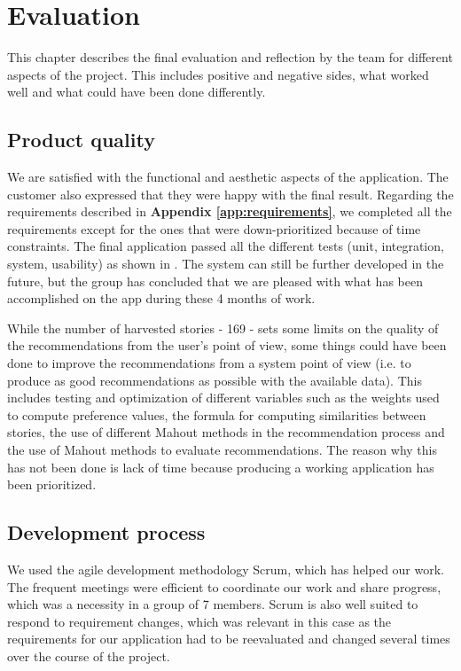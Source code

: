 
\chapter{Evaluation}

This chapter describes the final evaluation and reflection by the team for different aspects of the project. This includes positive and negative sides, what worked well and what could have been done differently.

\section{Product quality}

We are satisfied with the functional and aesthetic aspects of the application. The customer also expressed that they were happy with the final result. Regarding the requirements described in \textbf{Appendix \ref{app:requirements}}, we completed all the requirements except for the ones that were down-prioritized because of time constraints.
The final application passed all the different tests (unit, integration, system, usability) as shown in \textbf{}. The system can still be further developed in the future, but the group has concluded that we are pleased with what has been accomplished on the app during these 4 months of work.\newline

While the number of harvested stories - 169 - sets some limits on the quality of the recommendations from the user's point of view, some things could have been done to improve the recommendations from a system point of view (i.e. to produce as good recommendations as possible with the available data). This includes testing and optimization of different variables such as the weights used to compute preference values, the formula for computing similarities between stories, the use of different Mahout methods in the recommendation process and the use of Mahout methods to evaluate recommendations. The reason why this has not been done is lack of time because producing a working application has been prioritized.

\section{Development process}

We used the agile development methodology Scrum, which has helped our work. The frequent meetings were efficient to coordinate our work and share progress, which was a necessity in a group of 7 members. Scrum is also well suited to respond to requirement changes, which was relevant in this case as the requirements for our application had to be reevaluated and changed several times over the course of the project.

